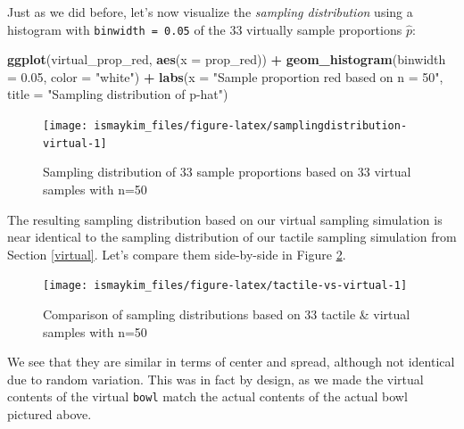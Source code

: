 \documentclass[12pt,]{krantz}
\makeatletter
\newenvironment{Shaded}{\begin{snugshade}}{\end{snugshade}}
\newcommand{\KeywordTok}[1]{\textcolor[rgb]{0.27,0.27,0.27}{\textbf{#1}}}
\newcommand{\DataTypeTok}[1]{\textcolor[rgb]{0.27,0.27,0.27}{#1}}
\newcommand{\FloatTok}[1]{\textcolor[rgb]{0.06,0.06,0.06}{#1}}
\newcommand{\StringTok}[1]{\textcolor[rgb]{0.5,0.5,0.5}{#1}}
\newcommand{\OperatorTok}[1]{\textcolor[rgb]{0.43,0.43,0.43}{\textbf{#1}}}
\newcommand{\NormalTok}[1]{#1}
\newenvironment{kframe}{%
\medskip{}
\setlength{\fboxsep}{.8em}
 \def\at@end@of@kframe{}%
 \ifinner\ifhmode%
  \def\at@end@of@kframe{\end{minipage}}%
  \begin{minipage}{\columnwidth}%
 \fi\fi%
 \def\FrameCommand##1{\hskip\@totalleftmargin \hskip-\fboxsep
 \colorbox{shadecolor}{##1}\hskip-\fboxsep
     \hskip-\linewidth \hskip-\@totalleftmargin \hskip\columnwidth}%
 \MakeFramed {\advance\hsize-\width
   \@totalleftmargin\z@ \linewidth\hsize
   \@setminipage}}%
 {\par\unskip\endMakeFramed%
 \at@end@of@kframe}
\renewenvironment{Shaded}{\begin{kframe}}{\end{kframe}}
\theoremstyle{definition}
\theoremstyle{definition}
\theoremstyle{definition}
\theoremstyle{remark}
\makeatother
\begin{document}
\endgroup{}

Just as we did before, let's now visualize the \emph{sampling
distribution} using a histogram with \texttt{binwidth\ =\ 0.05} of the
33 virtually sample proportions \(\widehat{p}\):

\begin{Shaded}
\begin{Highlighting}[]
\KeywordTok{ggplot}\NormalTok{(virtual_prop_red, }\KeywordTok{aes}\NormalTok{(}\DataTypeTok{x =}\NormalTok{ prop_red)) }\OperatorTok{+}
\StringTok{  }\KeywordTok{geom_histogram}\NormalTok{(}\DataTypeTok{binwidth =} \FloatTok{0.05}\NormalTok{, }\DataTypeTok{color =} \StringTok{"white"}\NormalTok{) }\OperatorTok{+}
\StringTok{  }\KeywordTok{labs}\NormalTok{(}\DataTypeTok{x =} \StringTok{"Sample proportion red based on n = 50"}\NormalTok{, }
       \DataTypeTok{title =} \StringTok{"Sampling distribution of p-hat"}\NormalTok{) }
\end{Highlighting}
\end{Shaded}

\begin{figure}

{\centering \texttt{[image: ismaykim\_files/figure-latex/samplingdistribution-virtual-1]} 

}

\caption{Sampling distribution of 33 sample proportions based on 33 virtual samples with n=50}\label{fig:samplingdistribution-virtual}
\end{figure}

The resulting sampling distribution based on our virtual sampling
simulation is near identical to the sampling distribution of our tactile
sampling simulation from Section \ref{virtual}. Let's compare them
side-by-side in Figure \ref{fig:tactile-vs-virtual}.




\begin{figure}

{\centering \texttt{[image: ismaykim\_files/figure-latex/tactile-vs-virtual-1]} 

}

\caption{Comparison of sampling distributions based on 33
tactile \& virtual samples with n=50}\label{fig:tactile-vs-virtual}
\end{figure}

We see that they are similar in terms of center and spread, although not
identical due to random variation. This was in fact by design, as we
made the virtual contents of the virtual \texttt{bowl} match the actual
contents of the actual bowl pictured above.
\end{document}
